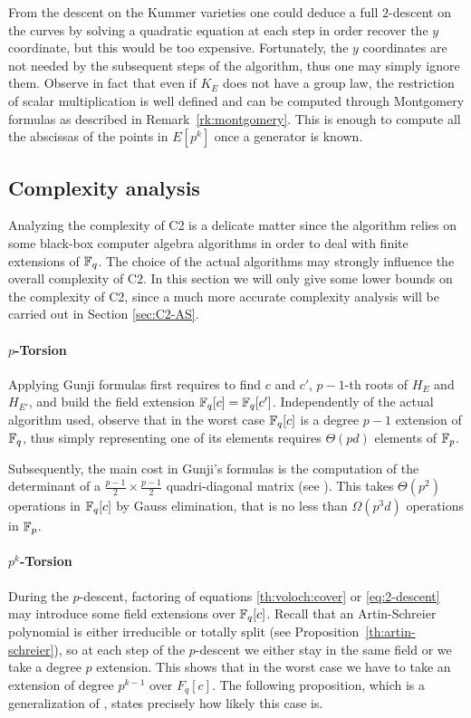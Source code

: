 From the descent on the Kummer varieties one could deduce a full
$2$-descent on the curves by solving a quadratic equation at each step
in order recover the $y$ coordinate, but this would be too
expensive. Fortunately, the $y$ coordinates are not needed by the
subsequent steps of the algorithm, thus one may simply ignore
them. Observe in fact that even if $K_E$ does not have a group law,
the restriction of scalar multiplication is well defined and can be
computed through Montgomery formulas as described in
Remark~\ref{rk:montgomery}. This is enough to compute all the
abscissas of the points in $E[p^k]$ once a generator is known.


\subsection{Complexity analysis}
\label{sec:C2:complexity}
Analyzing the complexity of C2 is a delicate matter since the
algorithm relies on some black-box computer algebra algorithms in
order to deal with finite extensions of $\mathbb{F}_q$. The choice of the
actual algorithms may strongly influence the overall complexity of C2.
In this section we will only give some lower bounds on the complexity
of C2, since a much more accurate complexity analysis will be carried
out in Section \ref{sec:C2-AS}.

\paragraph{$p$-Torsion}
Applying Gunji formulas first requires to find $c$ and $c'$, $p-1$-th
roots of $H_E$ and $H_{E'}$, and build the field extension $\mathbb{F}_q[c] =
\mathbb{F}_q[c']$. Independently of the actual algorithm used, observe that in
the worst case $\mathbb{F}_q[c]$ is a degree $p-1$ extension of $\mathbb{F}_q$, thus
simply representing one of its elements requires $\Theta(pd)$ elements
of $\mathbb{F}_p$.

Subsequently, the main cost in Gunji's formulas is the computation of
the determinant of a $\frac{p-1}{2}\times\frac{p-1}{2}$
quadri-diagonal matrix (see \cite{gunji76}). This takes $\Theta(p^2)$
operations in $\mathbb{F}_q[c]$ by Gauss elimination, that is no less than
$\Omega(p^3d)$ operations in $\mathbb{F}_p$.

\paragraph{$p^k$-Torsion}
During the $p$-descent, factoring of equations \eqref{th:voloch:cover}
or \eqref{eq:2-descent} may introduce some field extensions over
$\mathbb{F}_q[c]$. Recall that an Artin-Schreier polynomial is either
irreducible or totally split (see
Proposition~\ref{th:artin-schreier}), so at each step of the
$p$-descent we either stay in the same field or we take a degree $p$
extension. This shows that in the worst case we have to take an
extension of degree $p^{k-1}$ over $F_q[c]$. The following
proposition, which is a generalization of
\cite[Proposition~26]{lercier-algorithmique}, states precisely how
likely this case is.

